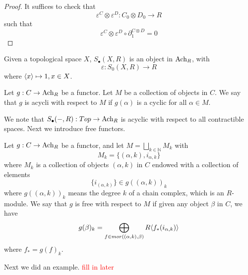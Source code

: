 \begin{proof}
    It suffices to check that 
    \begin{equation*}
        \varepsilon^C\otimes\varepsilon^D: C_0\otimes D_0\to R
    \end{equation*}
    such that 
    \begin{equation*}
        \varepsilon^C\otimes\varepsilon^D\circ\partial_1^{C\otimes D}=0
    \end{equation*}
\end{proof}
\begin{example}
    Given a topological space $X$, $S_\bullet(X,R)$ is an object in $\text{Ach}_R$, with 
    \begin{equation*}
        \varepsilon:S_0(X,R)\to R
    \end{equation*}
    where $\langle x\rangle\mapsto 1, x\in X$.
\end{example}
\begin{defn}
    Let $g:C\to\text{Ach}_R$ be a functor. Let $M$ be a collection of objects in $C$. We say that $g$ is acycli with respect to $M$ if $g(\alpha)$ is a cyclic for all $\alpha\in M$.
\end{defn}
We note that $S_\bullet(-,R):Top\to\text{Ach}_R$ is acyclic with respect to all contractible spaces. Next we introduce free functors.
\begin{defn}
    Let $g:C\to\text{Ach}_R$ be a functor, and let $M=\bigsqcup_{k\in\mathbb{N}}M_k$ with 
    \begin{equation*}
        M_k=\{(\alpha,k), i_{\alpha,k}\}
    \end{equation*}
    where $M_k$ is a collection of objects $(\alpha,k)$ in $C$ endowed with a collection of elements 
    \begin{equation*}
        \{i_{(\alpha,k)}\}\in g((\alpha,k))_k
    \end{equation*}
    where $g((\alpha,k))_k$ means the degree $k$ of a chain complex, which is an $R$-module. We say that $g$ is free with respect to $M$ if given any object $\beta$ in $C$, we have 
    \begin{equation*}
        g(\beta)_k=\bigoplus_{f\in mor((\alpha,k),\beta)}R\langle f_*(i_{\alpha,k})\rangle
    \end{equation*}
    where $f_*=g(f)_k$.
\end{defn}
Next we did an example. \textcolor{red}{fill in later}

